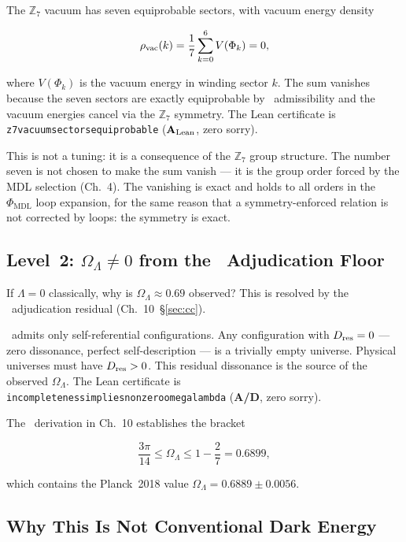 \documentclass[11pt,openany]{book}
\theoremstyle{remark}
\newcommand{\GTE}{\text{GTE}}
\newcommand{\MDL}{\text{MDL}}
\newcommand{\PSC}{\text{PSC}}
\newcommand{\ZS}{\mathbb{Z}_7}
\newcommand{\lean}[1]{%
  \penalty-100
  \begingroup\def\_{\textunderscore\allowbreak}\texttt{#1}\endgroup}
\newcommand{\CatAL}{\ensuremath{\textbf{A}_{\rm Lean}}}
\newcommand{\CatAD}{\textbf{A/D}}
\begin{document}
The $\ZS$ vacuum has seven equiprobable sectors, with vacuum energy density

\begin{equation}
\rho_{\rm vac}(k) = \frac{1}{7}\sum_{k=0}^{6} V(\Phi_k) = 0,
\end{equation}

where $V(\Phi_k)$ is the vacuum energy in winding sector $k$.  The sum vanishes because
the seven sectors are exactly equiprobable by \PSC\ admissibility and the vacuum
energies cancel via the $\ZS$ symmetry.  The Lean certificate is
\lean{z7\_vacuum\_sectors\_equiprobable} (\CatAL, zero sorry).

This is not a tuning: it is a consequence of the $\ZS$ group structure.  The number
seven is not chosen to make the sum vanish --- it is the group order forced by the
MDL selection (Ch.~4).  The vanishing is exact and holds to all orders in the $\Phi_\MDL$
loop expansion, for the same reason that a symmetry-enforced relation is not corrected
by loops: the symmetry is exact.

\subsection*{Level~2: $\Omega_\Lambda \neq 0$ from the \PSC\ Adjudication Floor}

If $\Lambda = 0$ classically, why is $\Omega_\Lambda \approx 0.69$ observed?  This is
resolved by the \PSC\ adjudication residual (Ch.~10~\S\ref{sec:cc}).

\PSC\ admits only self-referential configurations.  Any configuration with
$D_{\rm res} = 0$ --- zero dissonance, perfect self-description --- is a trivially empty
universe.  Physical universes must have $D_{\rm res} > 0$.  This residual dissonance
is the source of the observed $\Omega_\Lambda$.  The Lean certificate is
\lean{incompleteness\_implies\_nonzero\_omega\_lambda} (\CatAD, zero sorry).

The \GTE\ derivation in Ch.~10 establishes the bracket

\begin{equation}
\frac{3\pi}{14} \leq \Omega_\Lambda \leq 1 - \frac{2}{7} = 0.6899,
\end{equation}

which contains the Planck~2018 value $\Omega_\Lambda = 0.6889 \pm 0.0056$.

\subsection*{Why This Is Not Conventional Dark Energy}
\end{document}
